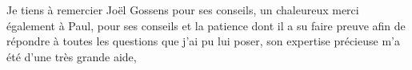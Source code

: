 Je tiens à remercier Joël Gossens pour ses conseils, un chaleureux merci également 
à Paul, pour ses conseils et la patience dont il a su faire preuve afin de 
répondre à toutes les questions que j'ai pu lui poser, son expertise précieuse 
m'a été d'une très grande aide, 

